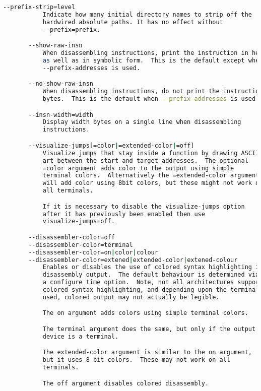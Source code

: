 {{\begin{lstlisting}[language=bash]
       --prefix-strip=level
           Indicate how many initial directory names to strip off the
           hardwired absolute paths. It has no effect without
           --prefix=prefix.

       --show-raw-insn
           When disassembling instructions, print the instruction in hex
           as well as in symbolic form.  This is the default except when
           --prefix-addresses is used.

       --no-show-raw-insn
           When disassembling instructions, do not print the instruction
           bytes.  This is the default when --prefix-addresses is used.

       --insn-width=width
           Display width bytes on a single line when disassembling
           instructions.

       --visualize-jumps[=color|=extended-color|=off]
           Visualize jumps that stay inside a function by drawing ASCII
           art between the start and target addresses.  The optional
           =color argument adds color to the output using simple
           terminal colors.  Alternatively the =extended-color argument
           will add color using 8bit colors, but these might not work on
           all terminals.

           If it is necessary to disable the visualize-jumps option
           after it has previously been enabled then use
           visualize-jumps=off.

       --disassembler-color=off
       --disassembler-color=terminal
       --disassembler-color=on|color|colour
       --disassembler-color=extened|extended-color|extened-colour
           Enables or disables the use of colored syntax highlighting in
           disassembly output.  The default behaviour is determined via
           a configure time option.  Note, not all architectures support
           colored syntax highlighting, and depending upon the terminal
           used, colored output may not actually be legible.

           The on argument adds colors using simple terminal colors.

           The terminal argument does the same, but only if the output
           device is a terminal.

           The extended-color argument is similar to the on argument,
           but it uses 8-bit colors.  These may not work on all
           terminals.

           The off argument disables colored disassembly.


\end{lstlisting}}}
